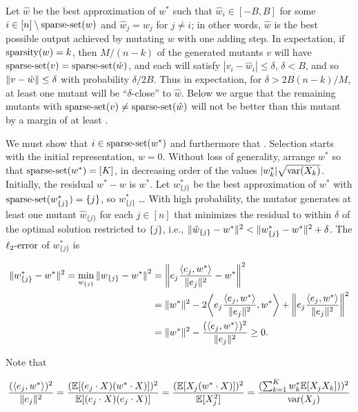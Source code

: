 Let $\hat{w}$ be the best approximation of $w^*$ such that $\hat{w}_i \in [-B, B]$
for some $i \in [n] \setminus \mathrm{sparse\mbox{-}set}(w)$ and $\hat{w}_j = w_j$ for $j \neq i$;
in other words, $\hat{w}$ is the best possible output achieved by mutating $w$ with
one adding step.
In expectation, if $\mathrm{sparsity}(w) = k$, then $M / (n - k)$ of the generated mutants
$v$ will have $\mathrm{sparse\mbox{-}set}(v) = \mathrm{sparse\mbox{-}set}(\hat{w})$, and each will satisfy
$|v_i - \hat{w}_i| \le \delta$, $\delta < B$, and so
$\Vert v - \hat{w} \Vert \le \delta$ with probability $\delta/2B$.
Thus in expectation, for $\delta > 2B(n-k) / M$, at least one mutant will be
``$\delta$-close'' to $\hat{w}$.
Below we argue that the remaining mutants with
$\mathrm{sparse\mbox{-}set}(v) \neq \mathrm{sparse\mbox{-}set}(\hat{w})$ will not be better than this mutant by
a margin of at least .

We must show that $i \in \mathrm{sparse\mbox{-}set}(w^*)$ and furthermore that
.
Selection starts with the initial representation, $w=0$.
Without loss of generality, arrange $w^*$ so that $\mathrm{sparse\mbox{-}set}(w^*) = [K]$,
in decreasing order of the values $\vert w^*_k \vert \sqrt{\mathrm{var}(X_k)}$.
Initially, the residual $w^* - w$ is $w^*$.
Let $w^*_{\{j\}}$ be the best approximation of $w^*$ with
$\mathrm{sparse\mbox{-}set}(w^*_{\{j\}}) = \{j\}$, so $w^*_{\{j\}}$ \dots
With high probability, the mutator generates at least one mutant
$\hat{w}_{\{j\}}$ for each $j \in [n]$ that minimizes the residual to within
$\delta$ of the optimal solution restricted to $\{j\}$, i.e.,
$\Vert \hat{w}_{\{j\}} - w^* \Vert^2 < \Vert w^*_{\{j\}} - w^* \Vert^2 + \delta$.
The $\mathrm{\ell_2\mbox{-}error}$ of $w^*_{\{j\}}$ is

\begin{align*}
\Vert w^*_{\{j\}} - w^* \Vert^2 = \min_{w_{\{j\}}}{\Vert w_{\{j\}} - w^* \Vert}^2
&= \bigg \Vert e_j \frac{\langle e_j, w^* \rangle}{\Vert e_j \Vert^2} - w^* \bigg \Vert^2 \\
&= \Vert w^* \Vert^2 - 2 \bigg \langle e_j \frac{\langle e_j, w^* \rangle}{\Vert e_j \Vert^2}, w^* \bigg \rangle + \bigg \Vert e_j \frac{\langle e_j, w^* \rangle}{\Vert e_j \Vert^2} \bigg \Vert^2 \\
&= \Vert w^* \Vert^2 - \frac{(\langle e_j, w^* \rangle)^2}{\Vert e_j \Vert^2} \ge 0.
\end{align*}

\noindent Note that

\[
\frac{(\langle e_j, w^* \rangle)^2}{\Vert e_j \Vert^2}
= \frac{(\mathbb{E}[(e_j \cdot X)(w^* \cdot X)])^2}{\mathbb{E}[(e_j \cdot X)(e_j \cdot X)]}
= \frac{(\mathbb{E}[X_j (w^* \cdot X)])^2}{\mathbb{E}[X_j^2]}
= \frac{(\sum_{k=1}^K w^*_k \mathbb{E}[X_j X_k]))^2}{\mathrm{var}(X_j)}
\]


